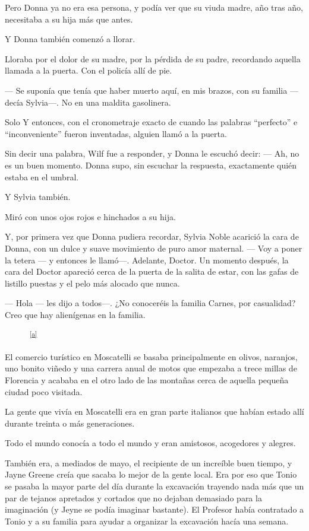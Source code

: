 Pero Donna ya no era esa persona, y podía ver que su viuda madre, año
tras año, necesitaba a su hija más que antes.

Y Donna también comenzó a llorar.

Lloraba por el dolor de su madre, por la pérdida de su padre, recordando
aquella llamada a la puerta. Con el policía allí de pie.

--- Se suponía que tenía que haber muerto aquí, en mis brazos, con su
familia --- decía Sylvia---. No en una maldita gasolinera.

Solo Y entonces, con el cronometraje exacto de cuando las palabras
``perfecto'' e ``inconveniente'' fueron inventadas, alguien llamó a la
puerta.

Sin decir una palabra, Wilf fue a responder, y Donna le escuchó decir:
--- Ah, no es un buen momento. Donna supo, sin escuchar la respuesta,
exactamente quién estaba en el umbral.

Y Sylvia también.

Miró con unos ojos rojos e hinchados a su hija.

Y, por primera vez que Donna pudiera recordar, Sylvia Noble acarició la
cara de Donna, con un dulce y suave movimiento de puro amor maternal.
--- Voy a poner la tetera --- y entonces le llamó---. Adelante, Doctor.
Un momento después, la cara del Doctor apareció cerca de la puerta de la
salita de estar, con las gafas de listillo puestas y el pelo más alocado
que nunca.

--- Hola --- les dijo a todos---. ¿No conoceréis la familia Carnes, por
casualidad? Creo que hay alienígenas en la familia.

~ ~ ~ ~\textsuperscript{\hyperref[cmnt1]{{[}a{]}}}

El comercio turístico en Moscatelli se basaba principalmente en olivos,
naranjos, uno bonito viñedo y una carrera anual de motos que empezaba a
trece millas de Florencia y acababa en el otro lado de las montañas
cerca de aquella pequeña ciudad poco visitada.

La gente que vivía en Moscatelli era en gran parte italianos que habían
estado allí durante treinta o más generaciones.

Todo el mundo conocía a todo el mundo y eran amistosos, acogedores y
alegres.

También era, a mediados de mayo, el recipiente de un increíble buen
tiempo, y Jayne Greene creía que sacaba lo mejor de la gente local. Era
por eso que Tonio se pasaba la mayor parte del día durante la excavación
trayendo nada más que un par de tejanos apretados y cortados que no
dejaban demasiado para la imaginación (y Jeyne se podía imaginar
bastante). El Profesor había contratado a Tonio y a su familia para
ayudar a organizar la excavación hacía una semana.

